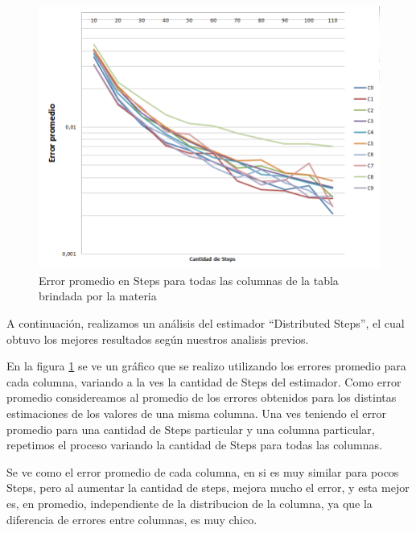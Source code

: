 \begin{figure}[H]
	    \includegraphics[scale=.60]{imagenes/variacion_parametro_y_columna_steps.png}
	    \caption{Error promedio en Steps para todas las columnas de la tabla brindada por la materia} 
	    \label{fig:variacion_parametro_y_columna_steps}
\end{figure}

	A continuaci\'on, realizamos un an\'alisis del estimador ``Distributed Steps'', el cual obtuvo los mejores resultados seg\'un nuestros analisis previos.
	
	En la figura \ref{fig:variacion_parametro_y_columna_steps} se ve un gr\'afico que se realizo utilizando los errores promedio para cada columna, variando a la ves la cantidad de Steps del estimador. Como error promedio considereamos al promedio de los errores obtenidos para los distintas estimaciones de los valores de una misma columna. Una ves teniendo el error promedio para una cantidad de Steps particular y una columna particular, repetimos el proceso variando la cantidad de Steps para todas las columnas.
	
	Se ve como el error promedio de cada columna, en si es muy similar para pocos Steps, pero al aumentar la cantidad de steps, mejora mucho el error, y esta mejor es, en promedio, independiente de la distribucion de la columna, ya que la diferencia de errores entre columnas, es muy chico.

